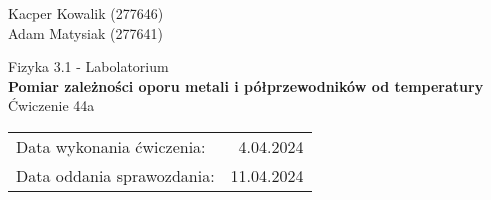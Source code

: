 \begin{flushright}
    Kacper Kowalik (277646) \\
    Adam Matysiak (277641)
\end{flushright}

\vspace{2mm}

\begin{center}
    Fizyka 3.1 - Labolatorium \\
    \vspace{15px}
    {\Large{\textbf{Pomiar zależności oporu metali i półprzewodników od temperatury}}} \\
    \vspace{15px}
    Ćwiczenie 44a \\
\end{center}
    
\begin{flushright}
    \begin{tabular}{lr}
         Data wykonania ćwiczenia:  & 4.04.2024 \\
         Data oddania sprawozdania: & 11.04.2024
    \end{tabular}
\end{flushright}
